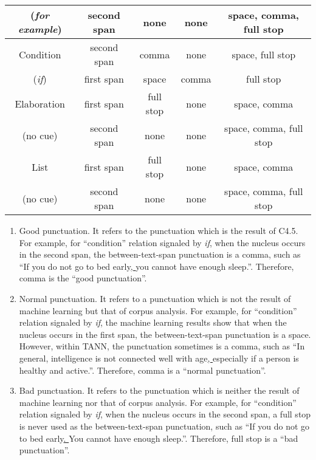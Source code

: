\documentclass[english]{jnlp_1.2.0}
\begin{document}
\begin{table}[b]
\begin{center}
\begin{tabular}{|c||c||c|c|c|}
(\textit{for example}) & second span    & none              & none   & space, comma, full stop \\ \hline \hline
Condition          & second span    & comma             & none   & space, full stop    \\ \cline{2-5}
(\textit{if})      & first span     & space             & comma  & full stop \\ \hline \hline
 Elaboration       & first span     & full stop         & none & space, comma \\ \cline{2-5}
 (no cue)          & second span    & none              & none & space, comma, full stop \\ \hline \hline
 List              & first span     & full stop         & none & space, comma      \\ \cline{2-5}
 (no cue)          & second span    & none              & none & space, comma, full stop \\ \hline
\end{tabular}
\end{center}
\end{table}

\begin{enumerate}
   \item Good punctuation. It refers to the punctuation which is the 
   result of C4.5. For example, for ``condition'' relation 
   signaled by \textit{if}, when the nucleus occurs in the second span, 
   the between-text-span punctuation is a comma, such as ``If 
   you do not go to bed early\underline{, }you cannot have enough sleep.''.
   Therefore, comma is the ``good punctuation''. 
   \item Normal punctuation. It refers to a punctuation which is not the 
   result of machine learning but that of corpus analysis. 
   For example, for ``condition'' relation signaled by \textit{if}, 
   the machine learning results show that when the nucleus occurs in the 
   first span, the between-text-span punctuation is a space. 
   However, within TANN, the punctuation sometimes is a comma, 
   such as ``In general, intelligence is not connected well with 
   age\underline{, } especially if a person is healthy and active.''.
   Therefore, comma is a ``normal punctuation''.
   \item Bad punctuation. It refers to the punctuation which is neither
   the result of machine learning nor that of corpus analysis. For example, for
   ``condition'' relation signaled by \textit{if}, when the nucleus occurs
   in the second span, a full stop is never used as the between-text-span 
   punctuation, such as ``If you do not go to bed early\underline{. }
   You cannot have enough sleep.''. Therefore, full stop is a ``bad punctuation''.
\end{enumerate}
\end{document}
